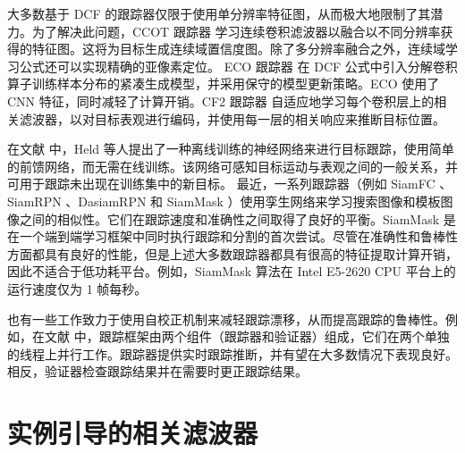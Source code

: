 大多数基于 DCF 的跟踪器仅限于使用单分辨率特征图，从而极大地限制了其潜力。为了解决此问题，CCOT 跟踪器 \cite{CCOT} 学习连续卷积滤波器以融合以不同分辨率获得的特征图。这将为目标生成连续域置信度图。除了多分辨率融合之外，连续域学习公式还可以实现精确的亚像素定位。
ECO 跟踪器 \cite{danelljan2017eco} 在 DCF 公式中引入分解卷积算子训练样本分布的紧凑生成模型，并采用保守的模型更新策略。ECO 使用了 CNN 特征，同时减轻了计算开销。CF2 跟踪器 \cite{Ma2015HierarchicalCF} 自适应地学习每个卷积层上的相关滤波器，以对目标表观进行编码，并使用每一层的相关响应来推断目标位置。

在文献 \cite{GOTURN} 中，Held 等人提出了一种离线训练的神经网络来进行目标跟踪，使用简单的前馈网络，而无需在线训练。该网络可感知目标运动与表观之间的一般关系，并可用于跟踪未出现在训练集中的新目标。
最近，一系列跟踪器（例如 SiamFC \cite{SiamFC}、SiamRPN \cite{SiamRPN}、DasiamRPN \cite{zhu2018distractor} 和 SiamMask \cite{Wang2018SiamMask}）使用孪生网络来学习搜索图像和模板图像之间的相似性。它们在跟踪速度和准确性之间取得了良好的平衡。SiamMask 是在一个端到端学习框架中同时执行跟踪和分割的首次尝试。尽管在准确性和鲁棒性方面都具有良好的性能，但是上述大多数跟踪器都具有很高的特征提取计算开销，因此不适合于低功耗平台。例如，SiamMask 算法在 Intel E5-2620 CPU 平台上的运行速度仅为 1 帧每秒。

也有一些工作致力于使用自校正机制来减轻跟踪漂移，从而提高跟踪的鲁棒性。例如，在文献 \cite{fan2018parallel} 中，跟踪框架由两个组件（跟踪器和验证器）组成，它们在两个单独的线程上并行工作。跟踪器提供实时跟踪推断，并有望在大多数情况下表现良好。相反，验证器检查跟踪结果并在需要时更正跟踪结果。

\section{实例引导的相关滤波器}

